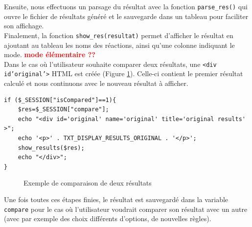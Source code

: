 Ensuite, nous effectuons un parsage du résultat avec la fonction \texttt{parse\_res()} qui ouvre le fichier de résultats généré et le sauvegarde dans un tableau pour faciliter son affichage. \\
Finalement, la fonction \texttt{show\_res(resultat)} permet d'afficher le résultat en ajoutant au tableau les noms des réactions, ainsi qu'une colonne indiquant le mode. \textbf{\textcolor{red}{mode élémentaire ??}} \\
Dans le cas où l'utilisateur souhaite comparer deux résultats, une \texttt{<div id'original'>} HTML est créée (Figure \ref{comparaison}). Celle-ci contient le premier résultat calculé et nous continuons avec le nouveau résultat à afficher.\\

\begin{DDbox}{\linewidth}
\begin{lstlisting}
if ($_SESSION["isCompared"]==1){
	$res=$_SESSION["compare"];
	echo "<div id='original' name='original' title='original results' >";
	echo '<p>' . TXT_DISPLAY_RESULTS_ORIGINAL . '</p>';
	show_results($res);
	echo "</div>";
}
\end{lstlisting}
\end{DDbox}

\begin{figure}[!ht]
    \begin{center}
        		\caption{Exemple de comparaison de deux résultats}
          \label{comparaison}
      \end{center}   
\end{figure}

Une fois toutes ces étapes finies, le résultat est sauvegardé dans la variable \texttt{compare} pour le cas où l'utilisateur voudrait comparer son résultat avec un autre (avec par exemple des choix différents d'options, de nouvelles règles).\\

